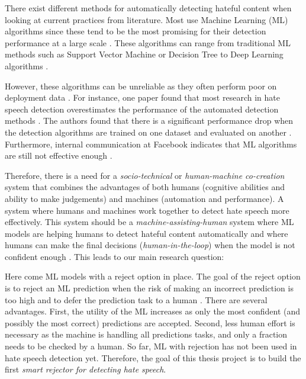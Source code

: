 There exist different methods for automatically detecting hateful content when looking at current practices from literature. Most use Machine Learning (ML) algorithms since these tend to be the most promising for their detection performance at a large scale \cite{balayn2021automatic, fortuna2018survey}. These algorithms can range from traditional ML methods such as Support Vector Machine or Decision Tree to Deep Learning algorithms \cite{fortuna2018survey}.

However, these algorithms can be unreliable as they often perform poor on deployment data \cite{balayn2021automatic}. For instance, one paper found that most research in hate speech detection overestimates the performance of the automated detection methods \cite{arango2019hate}. The authors found that there is a significant performance drop when the detection algorithms are trained on one dataset and evaluated on another \cite{arango2019hate}. Furthermore, internal communication at Facebook indicates that ML algorithms are still not effective enough \cite{noah2021giansiracusa}.

Therefore, there is a need for a \textit{socio-technical} or \textit{human-machine co-creation} \cite{woo2020future} system that combines the advantages of both humans (cognitive abilities and ability to make judgements) and machines (automation and performance). A system where humans and machines work together to detect hate speech more effectively. This system should be a \textit{machine-assisting-human} system where ML models are helping humans to detect hateful content automatically and where humans can make the final decisions (\textit{human-in-the-loop}) when the model is not confident enough \cite{woo2020future}. This leads to our main research question:


Here come ML models with a reject option in place. The goal of the reject option is to reject an ML prediction when the risk of making an incorrect prediction is too high and to defer the prediction task to a human \cite{hendrickx2021machine}. There are several advantages. First, the utility of the ML increases as only the most confident (and possibly the most correct) predictions are accepted. Second, less human effort is necessary as the machine is handling all predictions tasks, and only a fraction needs to be checked by a human. So far, ML with rejection has not been used in hate speech detection yet. Therefore, the goal of this thesis project is to build the first \textit{smart rejector for detecting hate speech}. 

